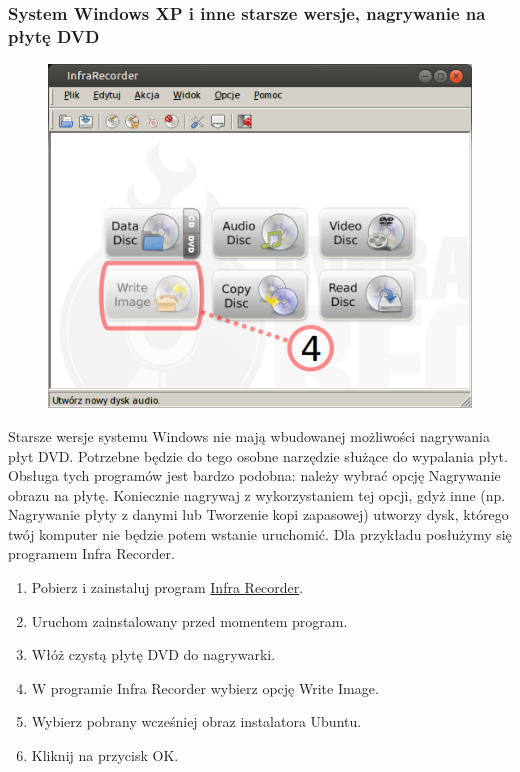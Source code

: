\subsubsection{System Windows XP i inne starsze wersje, nagrywanie na płytę DVD}
\begin{figure}
                \includegraphics[width=\linewidth]{images/instalacja_nagrywanie_obrazu_DVD_winXP.png}
\end{figure}

Starsze wersje systemu Windows nie mają wbudowanej możliwości nagrywania płyt DVD. Potrzebne będzie do tego osobne narzędzie służące do wypalania płyt. Obsługa tych programów jest bardzo podobna: należy wybrać opcję Nagrywanie obrazu na płytę. Koniecznie nagrywaj z wykorzystaniem tej opcji, gdyż inne (np. Nagrywanie płyty z danymi lub Tworzenie kopi zapasowej) utworzy dysk, którego twój komputer nie będzie potem wstanie uruchomić. Dla przykładu posłużymy się programem Infra Recorder.
\begin{enumerate}[label=\protect\circled{\arabic*}]
\item Pobierz i zainstaluj program \href{http://infrarecorder.org/?page_id=5}{Infra Recorder}.
\item Uruchom zainstalowany przed momentem program.
\item Włóż czystą płytę DVD do nagrywarki.
\item W programie Infra Recorder wybierz opcję \textcolor{ubuntu_orange}{Write Image}.
\item Wybierz pobrany wcześniej obraz instalatora Ubuntu.
\item Kliknij na przycisk \textcolor{ubuntu_orange}{OK}.
\end{enumerate}
\clearpage
